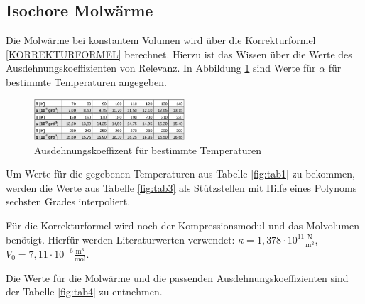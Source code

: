 \subsection{Isochore Molwärme}
Die Molwärme bei konstantem Volumen wird über die Korrekturformel \ref{KORREKTURFORMEL} berechnet. Hierzu ist das Wissen über die Werte des Ausdehnungskoeffizienten von Relevanz. In Abbildung \ref{fig:abb1} sind Werte für \(\alpha\) für bestimmte Temperaturen angegeben.

\begin{figure}
	\centering
		\includegraphics[width=0.5\textwidth]{alpha.png}
	\caption{Ausdehnungskoeffizent für bestimmte Temperaturen}
	\label{fig:abb1}
\end{figure}

\noindent Um Werte für die gegebenen Temperaturen aus Tabelle \ref{fig:tab1} zu bekommen, werden die Werte aus Tabelle \ref{fig:tab3} als Stützstellen mit Hilfe eines Polynoms sechsten Grades interpoliert. 

\noindent Für die Korrekturformel wird noch der Kompressionsmodul und das Molvolumen benötigt. Hierfür werden Literaturwerten verwendet: \(\kappa=1,378\cdot10^{11}\frac{\text{N}}{\text{m}^2}\), \(V_0=7,11\cdot10^{-6}\frac{\text{m}^3}{\text{mol}}\). 

\noindent Die Werte für die Molwärme und die passenden Ausdehnungskoeffizienten sind der Tabelle \ref{fig:tab4} zu entnehmen.

